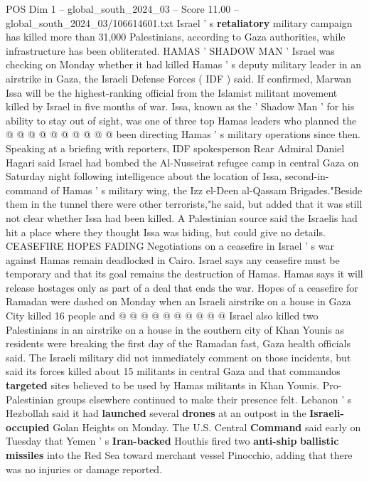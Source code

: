 \begin{textsample}{POS Dim 1 – global\_south\_2024\_03 – Score 11.00 – global\_south\_2024\_03/106614601.txt}
Israel ' s \textbf{retaliatory} military campaign has killed more than 31,000 Palestinians, according to Gaza authorities, while infrastructure has been obliterated.
HAMAS ' SHADOW MAN ' Israel was checking on Monday whether it had killed Hamas ' s deputy military leader in an airstrike in Gaza, the Israeli Defense Forces ( IDF ) said.
If confirmed, Marwan Issa will be the highest-ranking official from the Islamist militant movement killed by Israel in five months of war.
Issa, known as the ' Shadow Man ' for his ability to stay out of sight, was one of three top Hamas leaders who planned the @ @ @ @ @ @ @ @ @ @ been directing Hamas ' s military operations since then.
Speaking at a briefing with reporters, IDF spokesperson Rear Admiral Daniel Hagari said Israel had bombed the Al-Nusseirat refugee camp in central Gaza on Saturday night following intelligence about the location of Issa, second-in-command of Hamas ' s military wing, the Izz el-Deen al-Qassam Brigades."Beside them in the tunnel there were other terrorists,"he said, but added that it was still not clear whether Issa had been killed.
A Palestinian source said the Israelis had hit a place where they thought Issa was hiding, but could give no details.
CEASEFIRE HOPES FADING Negotiations on a ceasefire in Israel ' s war against Hamas remain deadlocked in Cairo.
Israel says any ceasefire must be temporary and that its goal remains the destruction of Hamas.
Hamas says it will release hostages only as part of a deal that ends the war.
Hopes of a ceasefire for Ramadan were dashed on Monday when an Israeli airstrike on a house in Gaza City killed 16 people and @ @ @ @ @ @ @ @ @ @ Israel also killed two Palestinians in an airstrike on a house in the southern city of Khan Younis as residents were breaking the first day of the Ramadan fast, Gaza health officials said.
The Israeli military did not immediately comment on those incidents, but said its forces killed about 15 militants in central Gaza and that commandos \textbf{targeted} sites believed to be used by Hamas militants in Khan Younis.
Pro-Palestinian groups elsewhere continued to make their presence felt.
Lebanon ' s Hezbollah said it had \textbf{launched} several \textbf{drones} at an outpost in the \textbf{Israeli-occupied} Golan Heights on Monday.
The U.S.
Central \textbf{Command} said early on Tuesday that Yemen ' s \textbf{Iran-backed} Houthis fired two \textbf{anti-ship} \textbf{ballistic} \textbf{missiles} into the Red Sea toward merchant vessel Pinocchio, adding that there was no injuries or damage reported.

\end{textsample}
